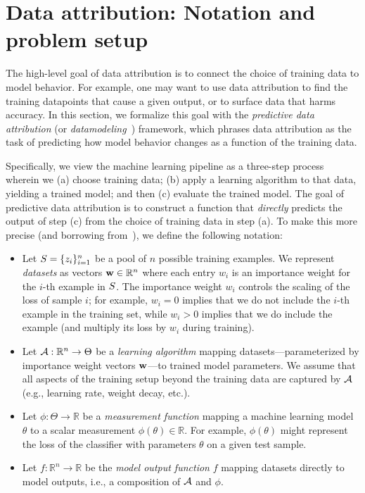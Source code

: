 \section{Data attribution: Notation and problem setup}
\label{sec:problem_setup}
The high-level goal of data attribution is to connect the choice of training
data to model behavior. For example, one may want to use data
attribution to find the training datapoints that cause a given output, or to
surface data that harms accuracy. In this section, we formalize this
goal with the {\em predictive data attribution} (or
\textit{datamodeling}~\citep{ilyas2022datamodels}) framework, which phrases data
attribution as the task of predicting how model behavior changes as a function
of the training data.

Specifically, we view the machine learning pipeline as a three-step process
wherein we
(a) choose training data;
(b) apply a learning algorithm to that data, yielding a trained model;
and then (c) evaluate the trained model.
The goal of predictive data attribution is to construct a function
that {\em directly} predicts the output of step (c) from the choice of
training data in step (a).
To make this more precise (and borrowing from~\citep{ilyas2022datamodels}),
we define the following notation:
\begin{itemize}
  \item Let $S = \{z_i\}_{i=1}^n$ be a pool of $n$ possible training
    examples. We represent {\em datasets} as vectors $\mathbf{w} \in \mathbb{R}^n$
    where each entry $w_i$ is an importance weight for the $i$-th example in
    $S$. The importance weight $w_i$ controls the scaling of the loss of
    sample $i$; for example, $w_i=0$ implies that we do not include the $i$-th
    example in the training set, while $w_i > 0$ implies that we do include the
    example (and multiply its loss by $w_i$ during training).
  \item Let $\mathcal{A}{}: \mathbb{R}^n \to \Theta$ be a {\em learning algorithm}
    mapping datasets---parameterized by importance weight vectors
    $\mathbf{w}$---to trained model
    parameters.
    We assume that all aspects of the training setup beyond the
    training data
    are captured by $\mathcal{A}{}$ (e.g., learning rate, weight decay, etc.).
  \item Let $\phi: \Theta \to \mathbb{R}$ be a {\em measurement
    function} mapping a machine learning model $\theta$ to a scalar measurement
    $\phi(\theta) \in \mathbb{R}$. For example, $\phi(\theta)$ might represent
    the loss of the classifier with parameters $\theta$ on a given test sample.
  \item Let $f: \mathbb{R}^n \to \mathbb{R}$ be the {\em model output function}
    $f$ mapping datasets directly to model outputs, i.e., a composition
    of $\mathcal{A}{}$ and $\phi$.
\end{itemize}
